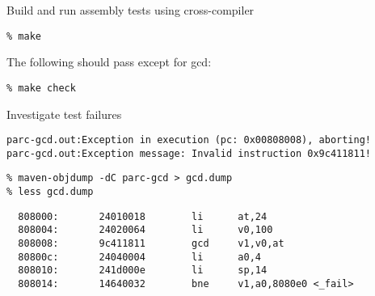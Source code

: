
\begin{task}
\begin{frame}[fragile]{Build and run assembly tests using cross-compiler}

\begin{Verbatim}[commandchars=\\\{\}]
% cd \midtilde/pydgin/parc/asm_tests_build
% make
\end{Verbatim}

The following should pass except for gcd:

\begin{verbatim}
% make check
\end{verbatim}

\end{frame}
\end{task}


\begin{task}
\begin{frame}[fragile]{Investigate test failures}

{\small
\begin{verbatim}
parc-gcd.out:Exception in execution (pc: 0x00808008), aborting!
parc-gcd.out:Exception message: Invalid instruction 0x9c411811!
\end{verbatim}}

\begin{Verbatim}[commandchars=\\\{\}]
% cd \midtilde/pydgin/parc/asm_tests/build
% maven-objdump -dC parc-gcd > gcd.dump
% less gcd.dump
\end{Verbatim}

{\small
\begin{verbatim}
  808000:       24010018        li      at,24
  808004:       24020064        li      v0,100
  808008:       9c411811        gcd     v1,v0,at
  80800c:       24040004        li      a0,4
  808010:       241d000e        li      sp,14
  808014:       14640032        bne     v1,a0,8080e0 <_fail>
\end{verbatim}}

\begin{Verbatim}[commandchars=\\\{\}]
% less \midtilde/pydgin/parc/asm_tests/parc/parc-gcd.S
\end{Verbatim}

\end{frame}
\end{task}

